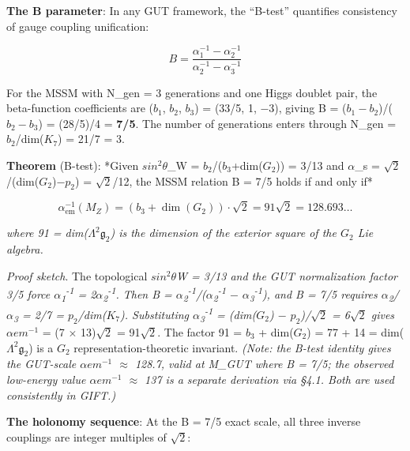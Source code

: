 \documentclass[11pt,a4paper]{article}
\begin{document}
\textbf{The B parameter}: In any GUT framework, the ``B-test''
quantifies consistency of gauge coupling unification:

\[B = \frac{\alpha_1^{-1} - \alpha_2^{-1}}{\alpha_2^{-1} - \alpha_3^{-1}}\]

For the MSSM with N\_gen = 3 generations and one Higgs doublet pair, the
beta-function coefficients are (\(b_{1}\), \(b_{2}\), \(b_{3}\)) =
(33/5, 1, \(- 3\)), giving B = (\(b_{1} - b_{2}\))/(\(b_{2} - b_{3}\)) =
(28/5)/4 = \textbf{7/5}. The number of generations enters through N\_gen
= \(b_{2}\)/dim(\(K_{7}\)) = 21/7 = 3.

\textbf{Theorem} (B-test): *Given \(sin^{2} \theta\)\_W =
\(b_{2}\)/(\(b_{3}\)+dim(\(G_{2}\))) = 3/13 and \(\alpha\)\_s =
$\sqrt{2}$/(dim(\(G_{2}\))\(- p_{2}\)) = $\sqrt{2}$/12, the MSSM relation B = 7/5 holds
if and only if*

\[\alpha_{\mathrm{em}}^{-1}(M_Z) = (b_3 + \dim(G_2)) \cdot \sqrt{2} = 91\sqrt{2} = 128.693\ldots\]

\emph{where 91 = dim($\Lambda^2 \mathfrak{g}_2$)
is the dimension of the exterior square of the \(G_{2}\) Lie algebra.}

\emph{Proof sketch}. The topological \(sin^{2} \theta\)\emph{W = 3/13
and the GUT normalization factor 3/5 force
\(\alpha\)\textsubscript{1}\textsuperscript{-}\textsuperscript{1} =
2\(\alpha\)\textsubscript{2}\textsuperscript{-}\textsuperscript{1}. Then
B =
\(\alpha\)\textsubscript{2}\textsuperscript{-}\textsuperscript{1}/(\(\alpha\)\textsubscript{2}\textsuperscript{-}\textsuperscript{1}
\(-\)
\(\alpha\)\textsubscript{3}\textsuperscript{-}\textsuperscript{1}), and
B = 7/5 requires \(\alpha\)\textsubscript{2}/\(\alpha\)\textsubscript{3}
= 2/7 = \(p_{2}\)/dim(\(K_{7}\)). Substituting
\(\alpha\)\textsubscript{3}\textsuperscript{-}\textsuperscript{1} =
(dim(\(G_{2}\)) \(-\) \(p_{2}\))/$\sqrt{2}$ = 6$\sqrt{2}$ gives \(\alpha\)}\(em^{-1}\) =
(7 \(\times\) 13)$\sqrt{2}$ = 91$\sqrt{2}$. The factor 91 = \(b_{3}\) + dim(\(G_{2}\)) =
77 + 14 = dim($\Lambda^2 \mathfrak{g}_2$) is a
\(G_{2}\) representation-theoretic invariant. \emph{(Note: the B-test
identity gives the GUT-scale \(\alpha\)\emph{\(em^{-1}\) \(\approx\)
128.7, valid at M\_GUT where B = 7/5; the observed low-energy value
\(\alpha\)}\(em^{-1}\) \(\approx\) 137 is a separate derivation via
§4.1. Both are used consistently in GIFT.)}

\textbf{The holonomy sequence}: At the B = 7/5 exact scale, all three
inverse couplings are integer multiples of $\sqrt{2}$:
\end{document}
